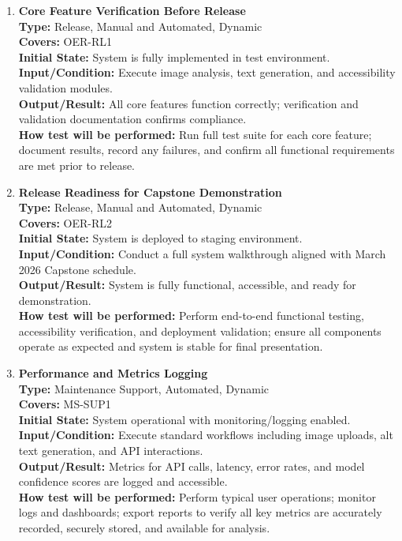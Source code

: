\documentclass[12pt, titlepage]{article}
\begin{document}
\begin{enumerate}[label=NFR-ST \arabic*., wide=0pt, leftmargin=*]
  \item \textbf{Core Feature Verification Before Release} \\[2mm]
    \textbf{Type:} Release, Manual and Automated, Dynamic \\
    \textbf{Covers:} OER-RL1 \\
    \textbf{Initial State:} System is fully implemented in test environment. \\
    \textbf{Input/Condition:} Execute image analysis, text
    generation, and accessibility validation modules. \\
    \textbf{Output/Result:} All core features function correctly;
    verification and validation documentation confirms compliance. \\[2mm]
    \textbf{How test will be performed:}
    Run full test suite for each core feature; document results,
    record any failures, and confirm all functional requirements are
    met prior to release.

  \item \textbf{Release Readiness for Capstone Demonstration} \\[2mm]
    \textbf{Type:} Release, Manual and Automated, Dynamic \\
    \textbf{Covers:} OER-RL2 \\
    \textbf{Initial State:} System is deployed to staging environment. \\
    \textbf{Input/Condition:} Conduct a full system walkthrough aligned
    with March 2026 Capstone schedule. \\
    \textbf{Output/Result:} System is fully functional, accessible, and
    ready for demonstration. \\[2mm]
    \textbf{How test will be performed:}
    Perform end-to-end functional testing, accessibility
    verification, and deployment validation; ensure all components
    operate as expected and system is stable for final presentation.

  \item \textbf{Performance and Metrics Logging} \\[2mm]
    \textbf{Type:} Maintenance Support, Automated, Dynamic \\
    \textbf{Covers:} MS-SUP1 \\
    \textbf{Initial State:} System operational with
    monitoring/logging enabled. \\
    \textbf{Input/Condition:} Execute standard workflows including
    image uploads, alt text generation, and API interactions. \\
    \textbf{Output/Result:} Metrics for API calls, latency, error
    rates, and model confidence scores are logged and accessible. \\[2mm]
    \textbf{How test will be performed:}
    Perform typical user operations; monitor logs and dashboards;
    export reports to verify all key metrics are accurately recorded,
    securely stored, and available for analysis.

\end{enumerate}
\end{document}

